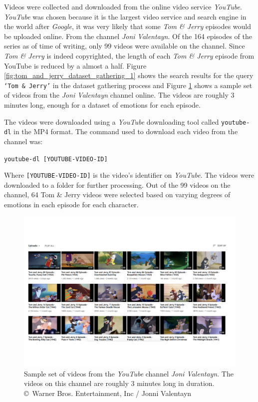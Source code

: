\documentclass[report, 11pt, oneside]{dissertation}
\begin{document}
Videos were collected and downloaded from the online video service \textit{YouTube}. \textit{YouTube} was chosen because it is the largest video service and search engine in the world after \textit{Google}, it was very likely that some \textit{Tom \& Jerry} episodes would be uploaded online. From the channel \textit{Joni Valentayn}. Of the 164 episodes of the series as of time of writing, only 99 videos were available on the channel. Since \textit{Tom \& Jerry} is indeed copyrighted, the length of each \textit{Tom \& Jerry} episode from YouTube is reduced by a almost a half. Figure \ref{fig:tom_and_jerry_dataset_gathering_1} shows the search results for the query \texttt{`Tom \& Jerry'} in the dataset gathering process and Figure \ref{fig:tom_and_jerry_dataset_gathering_2} shows a sample set of videos from the \textit{Joni Valentayn} channel online. The videos are roughly 3 minutes long, enough for a dataset of emotions for each episode.

The videos were downloaded using a \textit{YouTube} downloading tool called \texttt{youtube-dl} in the MP4 format. The command used to download each video from the channel was:

\begin{center}
	\texttt{youtube-dl [YOUTUBE-VIDEO-ID]}
\end{center}

Where \texttt{[YOUTUBE-VIDEO-ID]} is the video's identifier on \textit{YouTube}. The videos were downloaded to a folder for further processing. Out of the 99 videos on the channel, 64 Tom \& Jerry videos were selected based on varying degrees of emotions in each episode for each character.

 \begin{figure}[!htb]
	\centering
	\includegraphics[scale=0.50]{figure_20.pdf}
	\caption[Sample set of videos from the \textit{Joni Valentayn} \textit{YouTube} channel.]{Sample set of videos from the \textit{YouTube} channel \textit{Joni Valentayn}. The videos on this channel are roughly 3 minutes long in duration. \copyright \ Warner Bros. Entertainment, Inc / Jonni Valentayn}
	\label{fig:tom_and_jerry_dataset_gathering_2}
\end{figure}
\end{document}
